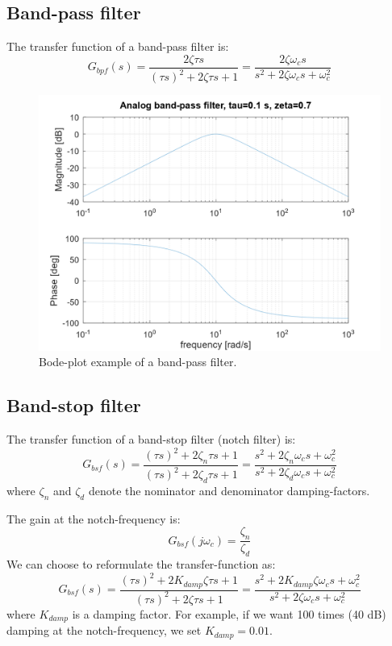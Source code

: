 \documentclass[]{book}
\begin{document}
\hypertarget{band-pass-filter}{%
\subsection{Band-pass filter}\label{band-pass-filter}}

The transfer function of a band-pass filter is:
\[
G_{bpf}(s) =  \frac{2\zeta \tau s}{(\tau s)^2 + 2\zeta \tau s + 1} = \frac{2\zeta \omega_c s}{s^2 + 2\zeta \omega_c s + \omega_c^2}
\label{eq:bpf}
\]

\begin{figure}
\includegraphics[width=1\linewidth]{images/filters/bpf} \caption{Bode-plot example of a band-pass filter.}\label{fig:unnamed-chunk-5}
\end{figure}

\hypertarget{band-stop-filter}{%
\subsection{Band-stop filter}\label{band-stop-filter}}

The transfer function of a band-stop filter (notch filter) is:
\[
G_{bsf}(s) = \frac{(\tau s)^2 + 2\zeta_n \tau s + 1}{(\tau s)^2 + 2\zeta_d \tau s + 1} 
=\frac{s^2 + 2\zeta_n \omega_c s + \omega_c^2}{s^2 + 2\zeta_d \omega_c s + \omega_c^2}
\label{eq:bsf1}
\]
where \(\zeta_n\) and \(\zeta_d\) denote the nominator and denominator damping-factors.

The gain at the notch-frequency is:
\[
G_{bsf}(j\omega_c) = \frac{\zeta_n }{\zeta_d }
\label{eq:bsf2}
\]
We can choose to reformulate the transfer-function as:
\[
G_{bsf}(s) = \frac{(\tau s)^2 + 2K_{damp}\zeta \tau s + 1}{(\tau s)^2 + 2\zeta \tau s + 1} 
=\frac{s^2 + 2K_{damp}\zeta \omega_c s + \omega_c^2}{s^2 + 2\zeta \omega_c s + \omega_c^2}
\label{eq:bsf1}
\]
where \(K_{damp}\) is a damping factor. For example, if we want 100 times (40 dB) damping at the notch-frequency, we set \(K_{damp} = 0.01\).
\end{document}
